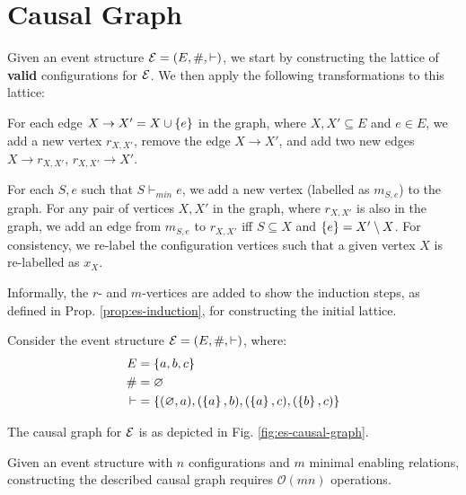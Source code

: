 \section{Causal Graph}

Given an event structure $\mathcal{E} = (E, \#, \vdash)$, we start by constructing
the lattice of \textbf{valid} configurations for $\mathcal{E}$. We then apply the following
transformations to this lattice:

For each edge $X \rightarrow X' = X \cup \left\{ e \right\}$ in the graph,
where $X, X' \subseteq E$ and $e \in E$,
we add a new vertex $r_{X,X'}$, remove the edge $X \rightarrow X'$,
and add two new edges $X \rightarrow r_{X,X'}$, $r_{X,X'} \rightarrow X'$.

For each $S, e$ such that $S \vdash_{min} e$, we add a new vertex
(labelled as $m_{S,e}$) to the graph. For any pair of vertices
$X, X'$ in the graph, where $r_{X,X'}$ is also in the graph, we add
an edge from $m_{S,e}$ to $r_{X,X'}$ iff $S \subseteq X$ and
$\left\{ e \right\} = X' \setminus X$. For consistency, we re-label the configuration vertices
such that a given vertex $X$ is re-labelled as $x_{X}$.

Informally, the $r$- and $m$-vertices are added to show the
induction steps, as defined in Prop. \ref{prop:es-induction},
for constructing the initial lattice.

\begin{exmp}\label{ex:es}
Consider the event structure $\mathcal{E} = (E, \#, \vdash)$,
where:
\begin{equation*}
\begin{split}
  E      & = \left\{ a, b, c \right\} \\
  \#     & = \varnothing \\
  \vdash & = \left\{ 
    (\varnothing, a), (\left\{ a \right\}, b), (\left\{ a \right\}, c), (\left\{ b \right\}, c)
   \right\}
\end{split}
\end{equation*}

The causal graph for $\mathcal{E}$ is as depicted in Fig. \ref{fig:es-causal-graph}.



\end{exmp}

\begin{prop}
Given an event structure with $n$ configurations
and $m$ minimal enabling relations,
constructing the described causal graph requires $\mathcal{O}(mn)$ operations.
\end{prop}